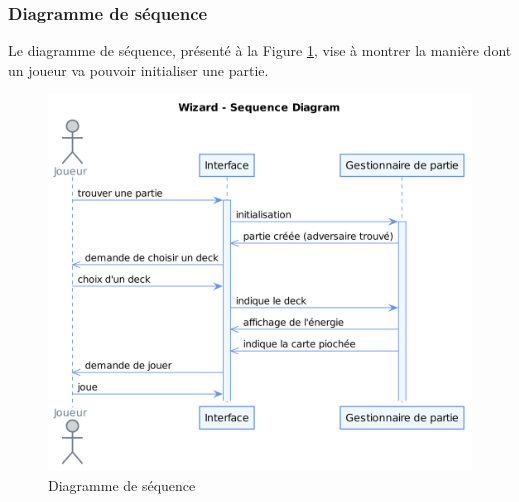 \documentclass[11pt,a4paper]{article}
\begin{document}
\subsubsection{Diagramme de séquence}

Le diagramme de séquence, présenté à la Figure \ref{fig:seq}, vise à montrer la manière dont un joueur va
pouvoir initialiser une partie.

\begin{figure}[ht]
  \centering
  \includegraphics[width=1\textwidth]{../uml_files/SequenceDiagram.png}
  \caption{\label{fig:seq} Diagramme de séquence}
\end{figure}
\end{document}

